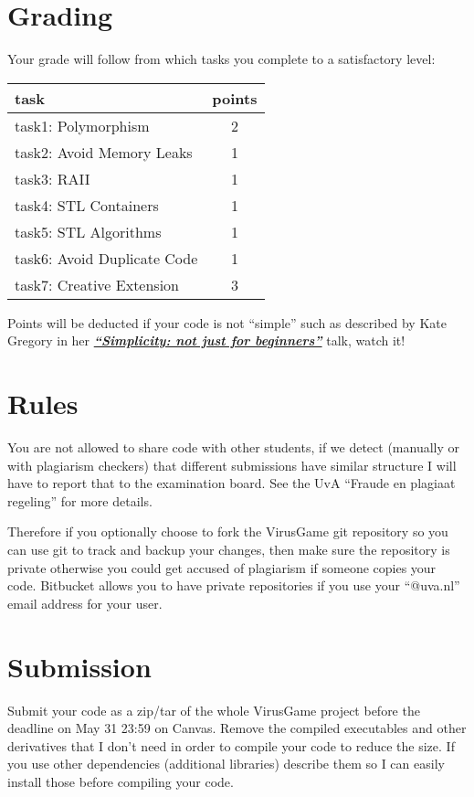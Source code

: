 \documentclass[12pt]{article}
\newcommand*{\link}[2]{\href{#1}{\color{blue}\textbf{\textit{#2}}}}
\begin{document}
\section{Grading}
Your grade will follow from which tasks you complete to a satisfactory
level:
\begin{center}
\begin{tabular}{ |l|c| } 
  \hline
  \textbf{task}               &  \textbf{points}\\ \hline
  task1: Polymorphism         &               2 \\
  task2: Avoid Memory Leaks   &               1 \\
  task3: RAII                 &               1 \\
  task4: STL Containers       &               1 \\
  task5: STL Algorithms       &               1 \\
  task6: Avoid Duplicate Code &               1 \\
  task7: Creative Extension   &               3 \\
  \hline
\end{tabular}
\end{center}

Points will be deducted if your code is not ``simple'' such as
described by Kate Gregory in her
\link{https://www.youtube.com/watch?v=O50qTuM5OT0} {``Simplicity: not
  just for beginners''} talk, watch it!

\section{Rules}
You are not allowed to share code with other students, if we detect
(manually or with plagiarism checkers) that different submissions have
similar structure I will have to report that to the examination
board. See the UvA ``Fraude en plagiaat regeling'' for more details.

Therefore if you optionally choose to fork the VirusGame git
repository so you can use git to track and backup your changes, then
make sure the repository is private otherwise you could get accused of
plagiarism if someone copies your code. Bitbucket allows you to have
private repositories if you use your ``@uva.nl'' email address for your
user.

\section{Submission}
Submit your code as a zip/tar of the whole VirusGame project before
the deadline on May 31 23:59 on Canvas. Remove the compiled executables
and other derivatives that I don't need in order to compile your code
to reduce the size. If you use other dependencies (additional
libraries) describe them so I can easily install those before
compiling your code.
\end{document}
